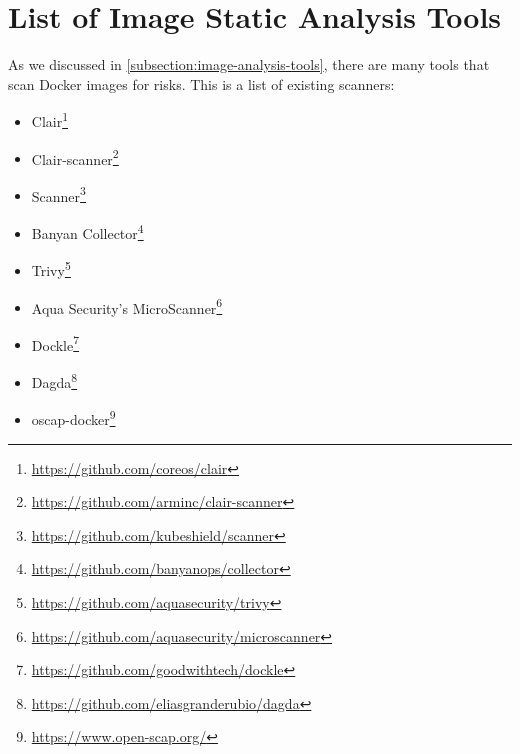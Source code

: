 \chapter{List of Image Static Analysis Tools}\label{appendix:static-analysis-list}
As we discussed in \autoref{subsection:image-analysis-tools}, there are many tools that scan Docker images for risks. This is a list of existing scanners:
\begin{itemize}
    \item Clair\footnote{\url{https://github.com/coreos/clair}}
    \item Clair-scanner\footnote{\url{https://github.com/arminc/clair-scanner}}
    \item Scanner\footnote{\url{https://github.com/kubeshield/scanner}}
    \item Banyan Collector\footnote{\url{https://github.com/banyanops/collector}}
    \item Trivy\footnote{\url{https://github.com/aquasecurity/trivy}}
    \item Aqua Security's MicroScanner\footnote{\url{https://github.com/aquasecurity/microscanner}}
    \item Dockle\footnote{\url{https://github.com/goodwithtech/dockle}}
    \item Dagda\footnote{\url{https://github.com/eliasgranderubio/dagda}}
    \item oscap-docker\footnote{\url{https://www.open-scap.org/}}
\end{itemize}
